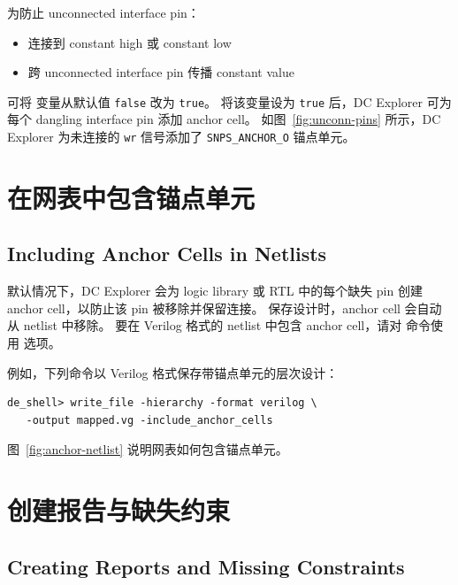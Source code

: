 为防止 unconnected interface pin：
\begin{itemize}
  \item 连接到 constant high 或 constant low
  \item 跨 unconnected interface pin 传播 constant value
\end{itemize}
可将  变量从默认值 \texttt{false} 改为 \texttt{true}。
将该变量设为 \texttt{true} 后，DC Explorer 可为每个 dangling interface pin 添加 anchor cell。
如图~\ref{fig:unconn-pins} 所示，DC Explorer 为未连接的 \texttt{wr} 信号添加了 \texttt{SNPS\_ANCHOR\_O} 锚点单元。


\section{在网表中包含锚点单元}
\subsection*{Including Anchor Cells in Netlists}

默认情况下，DC Explorer 会为 logic library 或 RTL 中的每个缺失 pin 创建 anchor cell，以防止该 pin 被移除并保留连接。
保存设计时，anchor cell 会自动从 netlist 中移除。
要在 Verilog 格式的 netlist 中包含 anchor cell，请对  命令使用  选项。

例如，下列命令以 Verilog 格式保存带锚点单元的层次设计：
\begin{lstlisting}
de_shell> write_file -hierarchy -format verilog \
   -output mapped.vg -include_anchor_cells
\end{lstlisting}

图~\ref{fig:anchor-netlist} 说明网表如何包含锚点单元。


\section{创建报告与缺失约束}
\subsection*{Creating Reports and Missing Constraints}

